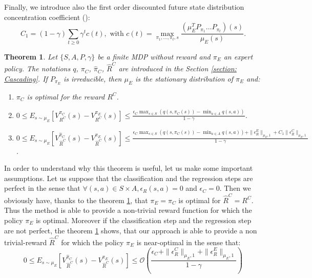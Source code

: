 \documentclass[11pt]{article}
\newtheorem{theorem}{Theorem}
\newcommand{\0}{\mathbf{0}}
\newcommand{\1}{\mathbf{1}}
\begin{document}
Finally, we introduce also the first order discounted future state distribution concentration coefficient (\cite{MunosSIAM07}):
\begin{equation}
C_1=(1-\gamma)\sum_{t\geq0}\gamma^tc(t), \text{ with } c(t)=\max_{\pi_1,\dots,\pi_t,s}\frac{(\mu_E^TP_{\pi_1}\dots P_{\pi_t})(s)}{\mu_E(s)}.
\end{equation}
\begin{theorem}
\label{theorem : results}
Let $\{S,A,P,\gamma\}$ be a finite MDP without reward and $\pi_E$ an expert policy.
The notations $q$, $\pi_C$, $\hat{\pi}_C$, $\hat{R}^C$ are introduced in the Section \ref{section: Cascading}.
If $P_{\pi_E}$ is irreducible, then $\mu_E$ is the stationary distribution of $\pi_E$ and:
\begin{enumerate}
\item $\pi_C$ is optimal for the reward $R^C$.
\item $0\leq E_{s\sim\mu_E}[V^{\pi_C}_{R^C}(s)-V^{\pi_E}_{R^C}(s)]\leq\frac{\epsilon_C\max_{s\in S}(q(s,\pi_C(s))-\min_{a\in A}q(s,a))}{1-\gamma}$.
\item $0 \leq E_{s\sim\mu_E}[V^{\hat{\pi}_C}_{\hat{R}^C}(s)-V^{\pi_E}_{\hat{R}^C}(s)]\leq \frac{\epsilon_C\max_{s\in S}(q(s,\pi_C(s))-\min_{a\in A}q(s,a))+\|\epsilon^E_R\|_{\mu_E,1}+C_1\|\epsilon^C_R\|_{\mu_E,1}}{1-\gamma}$.
\end{enumerate}
\end{theorem}
In order to understand why this theorem is useful, let us make some important assumptions. Let us suppose that the classification and the regression steps are perfect in the sense that $\forall (s,a)\in S\times A,\epsilon_R(s,a)=0$ and $\epsilon_C=0$. Then we obviously have, thanks to the theorem \ref{theorem : results}, that $\pi_E=\pi_C$ is optimal for $\hat{R}^C=R^C$. Thus the method is able to provide a non-trivial reward function for which the policy $\pi_E$ is optimal. Moreover if the classification step and the regression step are not perfect, the theorem \ref{theorem : results} shows, that our approach is able to provide a non trivial-reward $\hat{R}^C$ for which the policy $\pi_E$ is near-optimal in the sense that:
\begin{equation}
0 \leq E_{s \sim \mu_E}[V^{\hat{\pi}_C}_{\hat{R}^C}(s)-V^{\pi_E}_{\hat{R}^C}(s)]\leq \mathcal{O}(\frac{\epsilon_C+ \|\epsilon^C_R\|_{\mu_E,1}+\|\epsilon^E_R\|_{\mu_E,1}}{1-\gamma})
\end{equation}
\end{document}
